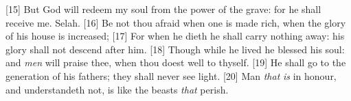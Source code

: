 [15] \textcolor[cmyk]{0.99998,1,0,0}{But God will redeem my soul from the power of the grave: for he shall receive me. Selah.}
[16] \textcolor[cmyk]{0.99998,1,0,0}{Be not thou afraid when one is made rich, when the glory of his house is increased;}
[17] \textcolor[cmyk]{0.99998,1,0,0}{For when he dieth he shall carry nothing away: his glory shall not descend after him.}
[18] \textcolor[cmyk]{0.99998,1,0,0}{Though while he lived he blessed his soul: and \emph{men} will praise thee, when thou doest well to thyself.}
[19] \textcolor[cmyk]{0.99998,1,0,0}{He shall go to the generation of his fathers; they shall never see light.}
[20] \textcolor[cmyk]{0.99998,1,0,0}{Man \emph{that} \emph{is} in honour, and understandeth not, is like the beasts \emph{that} perish.}